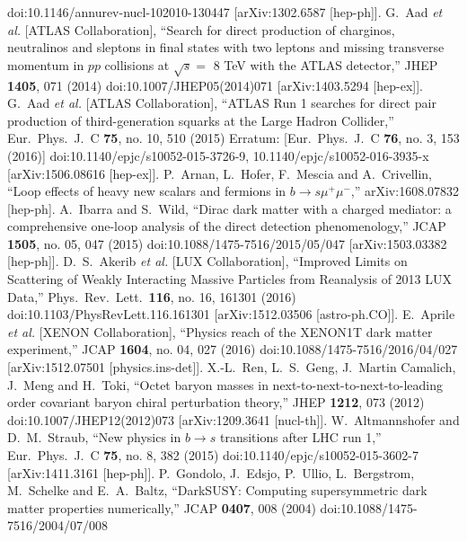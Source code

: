 \begin{thebibliography}{xxx}
  doi:10.1146/annurev-nucl-102010-130447
  [arXiv:1302.6587 [hep-ph]].
    G.~Aad {\it et al.} [ATLAS Collaboration],
  ``Search for direct production of charginos, neutralinos and sleptons in final states with two leptons and missing transverse momentum in $pp$ collisions at $\sqrt{s} =$ 8 TeV with the ATLAS detector,''
  JHEP {\bf 1405}, 071 (2014)
  doi:10.1007/JHEP05(2014)071
  [arXiv:1403.5294 [hep-ex]].
    G.~Aad {\it et al.} [ATLAS Collaboration],
  ``ATLAS Run 1 searches for direct pair production of third-generation squarks at the Large Hadron Collider,''
  Eur.\ Phys.\ J.\ C {\bf 75}, no. 10, 510 (2015)
  Erratum: [Eur.\ Phys.\ J.\ C {\bf 76}, no. 3, 153 (2016)]
  doi:10.1140/epjc/s10052-015-3726-9, 10.1140/epjc/s10052-016-3935-x
  [arXiv:1506.08616 [hep-ex]].
   P.~Arnan, L.~Hofer, F.~Mescia and A.~Crivellin,
  ``Loop effects of heavy new scalars and fermions in $b\to s\mu^+\mu^-$,''
  arXiv:1608.07832 [hep-ph].
    A.~Ibarra and S.~Wild,
  ``Dirac dark matter with a charged mediator: a comprehensive one-loop analysis of the direct detection phenomenology,''
  JCAP {\bf 1505}, no. 05, 047 (2015)
  doi:10.1088/1475-7516/2015/05/047
  [arXiv:1503.03382 [hep-ph]].
    D.~S.~Akerib {\it et al.} [LUX Collaboration],
  ``Improved Limits on Scattering of Weakly Interacting Massive Particles from Reanalysis of 2013 LUX Data,''
  Phys.\ Rev.\ Lett.\  {\bf 116}, no. 16, 161301 (2016)
  doi:10.1103/PhysRevLett.116.161301
  [arXiv:1512.03506 [astro-ph.CO]].
    E.~Aprile {\it et al.} [XENON Collaboration],
  ``Physics reach of the XENON1T dark matter experiment,''
  JCAP {\bf 1604}, no. 04, 027 (2016)
  doi:10.1088/1475-7516/2016/04/027
  [arXiv:1512.07501 [physics.ins-det]].
    X.-L.~Ren, L.~S.~Geng, J.~Martin Camalich, J.~Meng and H.~Toki,
  ``Octet baryon masses in next-to-next-to-next-to-leading order covariant baryon chiral perturbation theory,''
  JHEP {\bf 1212}, 073 (2012)
  doi:10.1007/JHEP12(2012)073
  [arXiv:1209.3641 [nucl-th]].
    W.~Altmannshofer and D.~M.~Straub,
  ``New physics in $b\rightarrow s$ transitions after LHC run 1,''
  Eur.\ Phys.\ J.\ C {\bf 75}, no. 8, 382 (2015)
  doi:10.1140/epjc/s10052-015-3602-7
  [arXiv:1411.3161 [hep-ph]].
    P.~Gondolo, J.~Edsjo, P.~Ullio, L.~Bergstrom, M.~Schelke and E.~A.~Baltz,
  ``DarkSUSY: Computing supersymmetric dark matter properties numerically,''
  JCAP {\bf 0407}, 008 (2004)
  doi:10.1088/1475-7516/2004/07/008

\end{thebibliography}
